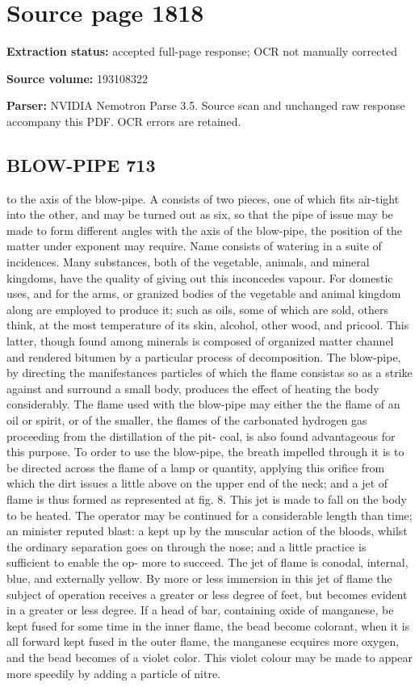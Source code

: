 \clearpage
\section{Source page 1818}
\textbf{Extraction status:} accepted full-page response; OCR not manually corrected\par
\textbf{Source volume:} 193108322\par
\textbf{Parser:} NVIDIA Nemotron Parse 3.5. Source scan and unchanged raw response accompany this PDF. OCR errors are retained.\par\medskip
\subsection*{BLOW-PIPE 713}
to the axis of the blow-pipe. A consists of two pieces, one of which fits air-tight into the other, and may be turned out as six, so that the pipe of issue may be made to form different angles with the axis of the blow-pipe, the position of the matter under exponent may require. Name consists of watering in a suite of incidences. Many substances, both of the vegetable, animals, and mineral kingdoms, have the quality of giving out this inconcedes vapour. For domestic uses, and for the arms, or granized bodies of the vegetable and animal kingdom along are employed to produce it; such as oils, some of which are sold, others think, at the most temperature of its skin, alcohol, other wood, and pricool. This latter, though found among minerals is composed of organized matter channel and rendered bitumen by a particular process of decomposition. The blow-pipe, by directing the manifestances particles of which the flame consistas so as a strike against and surround a small body, produces the effect of heating the body considerably. The flame used with the blow-pipe may either the the flame of an oil or spirit, or of the smaller, the flames of the carbonated hydrogen gas proceeding from the distillation of the pit- coal, is also found advantageous for this purpose. To order to use the blow-pipe, the breath impelled through it is to be directed across the flame of a lamp or quantity, applying this orifice from which the dirt issues a little above on the upper end of the neck; and a jet of flame is thus formed as represented at fig. 8. This jet is made to fall on the body to be heated. The operator may be continued for a considerable length than time; an minister reputed blast: a kept up by the muscular action of the bloods, whilst the ordinary separation goes on through the nose; and a little practice is sufficient to enable the op- more to succeed. The jet of flame is conodal, internal, blue, and externally yellow. By more or less immersion in this jet of flame the subject of operation receives a greater or less degree of feet, but becomes evident in a greater or less degree. If a head of bar, containing oxide of manganese, be kept fused for some time in the inner flame, the bead become colorant, when it is all forward kept fused in the outer flame, the manganese ecquires more oxygen, and the bead becomes of a violet color. This violet colour may be made to appear more speedily by adding a particle of nitre.\par\medskip
